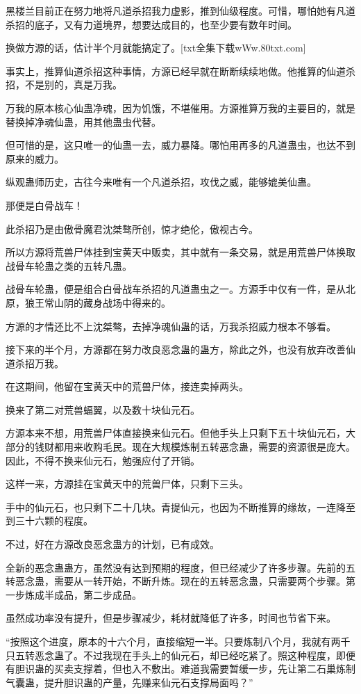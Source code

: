 \begin{this_body}
黑楼兰目前正在努力地将凡道杀招我力虚影，推到仙级程度。可惜，哪怕她有凡道杀招的底子，又有力道境界，想要达成目的，也至少要有数年时间。

换做方源的话，估计半个月就能搞定了。[txt全集下载wWw.80txt.com]

事实上，推算仙道杀招这种事情，方源已经早就在断断续续地做。他推算的仙道杀招，不是别的，真是万我。

万我的原本核心仙蛊净魂，因为饥饿，不堪催用。方源推算万我的主要目的，就是替换掉净魂仙蛊，用其他蛊虫代替。

但可惜的是，这只唯一的仙蛊一去，威力暴降。哪怕用再多的凡道蛊虫，也达不到原来的威力。

纵观蛊师历史，古往今来唯有一个凡道杀招，攻伐之威，能够媲美仙蛊。

那便是白骨战车！

此杀招乃是由傲骨魔君沈桀骜所创，惊才绝伦，傲视古今。

所以方源将荒兽尸体挂到宝黄天中贩卖，其中就有一条交易，就是用荒兽尸体换取战骨车轮蛊之类的五转凡蛊。

战骨车轮蛊，便是组合白骨战车杀招的凡道蛊虫之一。方源手中仅有一件，是从北原，狼王常山阴的藏身战场中得来的。

方源的才情还比不上沈桀骜，去掉净魂仙蛊的话，万我杀招威力根本不够看。

接下来的半个月，方源都在努力改良恶念蛊的蛊方，除此之外，也没有放弃改善仙道杀招万我。

在这期间，他留在宝黄天中的荒兽尸体，接连卖掉两头。

换来了第二对荒兽蝠翼，以及数十块仙元石。

方源本来不想，用荒兽尸体直接换来仙元石。但他手头上只剩下五十块仙元石，大部分的钱财都用来收购毛民。现在大规模炼制五转恶念蛊，需要的资源很是庞大。因此，不得不换来仙元石，勉强应付了开销。

这样一来，方源挂在宝黄天中的荒兽尸体，只剩下三头。

手中的仙元石，也只剩下二十几块。青提仙元，也因为不断推算的缘故，一连降至到三十六颗的程度。

不过，好在方源改良恶念蛊方的计划，已有成效。

全新的恶念蛊蛊方，虽然没有达到预期的程度，但已经减少了许多步骤。先前的五转恶念蛊，需要从一转开始，不断升炼。现在的五转恶念蛊，只需要两个步骤。第一步炼成半成品，第二步成品。

虽然成功率没有提升，但是步骤减少，耗材就降低了许多，时间也节省下来。

“按照这个进度，原本的十六个月，直接缩短一半。只要炼制八个月，我就有两千只五转恶念蛊了。不过我现在手头上的仙元石，却已经吃紧了。照这种程度，即便有胆识蛊的买卖支撑着，但也入不敷出。难道我需要暂缓一步，先让第二石巢炼制气囊蛊，提升胆识蛊的产量，先赚来仙元石支撑局面吗？”


\end{this_body}
